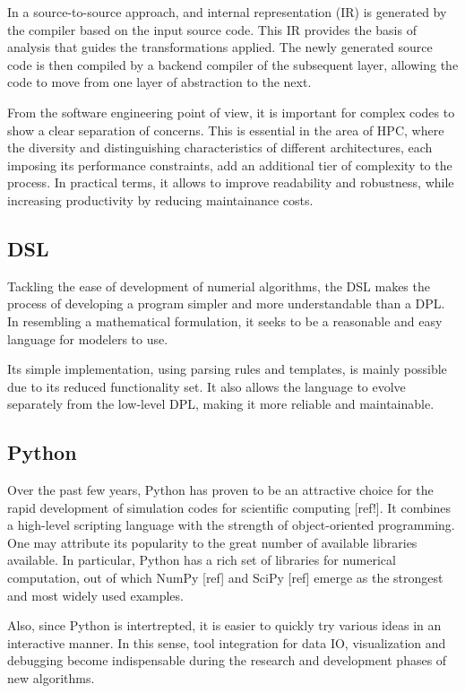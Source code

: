 \documentclass[english]{article}
\begin{document}
In a source-to-source approach, and internal representation (IR) is generated by the compiler based on the input source code.
This IR provides the basis of analysis that guides the transformations applied.
The newly generated source code is then compiled by a backend compiler of the subsequent layer, allowing the code to move from one layer of abstraction to the next.

From the software engineering point of view, it is important for complex codes to show a clear separation of concerns.
This is essential in the area of HPC, where the diversity and distinguishing characteristics of different architectures, each imposing its performance constraints, add an additional tier of complexity to the process.
In practical terms, it allows to improve readability and robustness, while increasing productivity by reducing maintainance costs.


\subsection{DSL}
Tackling the ease of development of numerial algorithms, the DSL makes the process of developing a program simpler and more understandable than a DPL.
In resembling a mathematical formulation, it seeks to be a reasonable and easy language for modelers to use.

Its simple implementation, using parsing rules and templates, is mainly possible due to its reduced functionality set.
It also allows the language to evolve separately from the low-level DPL, making it more reliable and maintainable.


\subsection{Python}
Over the past few years, Python has proven to be an attractive choice for the rapid development of simulation codes for scientific computing [ref!].
It combines a high-level scripting language with the strength of object-oriented programming.
One may attribute its popularity to the great number of available libraries available.
In particular, Python has a rich set of libraries for numerical computation, out of which NumPy [ref] and SciPy [ref] emerge as the strongest and most widely used examples.

Also, since Python is intertrepted, it is easier to quickly try various ideas in an interactive manner.
In this sense, tool integration for data IO, visualization and debugging become indispensable during the research and development phases of new algorithms.
\end{document}
